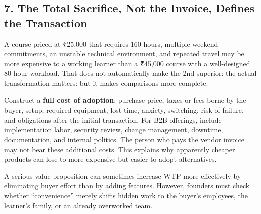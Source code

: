 \subsection*{7. The Total Sacrifice, Not the Invoice, Defines the Transaction}

A course priced at ₹25,000 that requires 160 hours, multiple weekend commitments, an unstable technical environment, and repeated travel may be more expensive to a working learner than a ₹45,000 course with a well-designed 80-hour workload. That does not automatically make the 2nd superior: the actual transformation matters: but it makes comparisons more complete.

Construct a \textbf{full cost of adoption}: purchase price, taxes or fees borne by the buyer, setup, required equipment, lost time, anxiety, switching, risk of failure, and obligations after the initial transaction. For B2B offerings, include implementation labor, security review, change management, downtime, documentation, and internal politics. The person who pays the vendor invoice may not bear these additional costs. This explains why apparently cheaper products can lose to more expensive but easier-to-adopt alternatives.

A serious value proposition can sometimes increase WTP more effectively by eliminating buyer effort than by adding features. However, founders must check whether ``convenience'' merely shifts hidden work to the buyer's employees, the learner's family, or an already overworked team.
